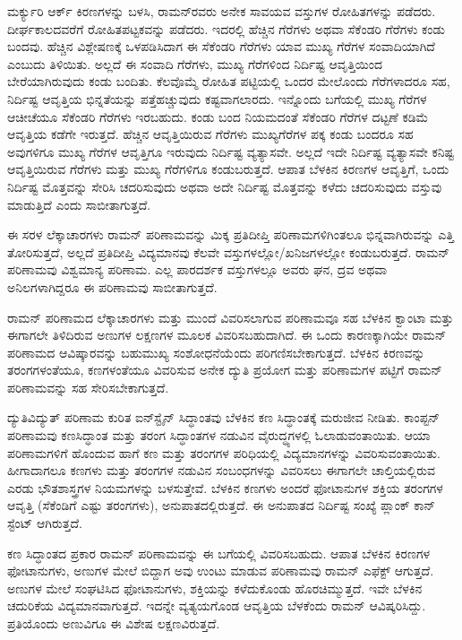 ಮರ್ಕ್ಯುರಿ ಆರ್ಕ್ ಕಿರಣಗಳನ್ನು ಬಳಸಿ, ರಾಮನ್‍ರವರು ಅನೇಕ ಸಾವಯವ ವಸ್ತುಗಳ ರೋಹಿತಗಳನ್ನು ಪಡೆದರು. ದೀರ್ಘಕಾಲದವರೆಗೆ ರೋಹಿತಪಟ್ಟಕವನ್ನು ಪಡೆದರು. ಇದರಲ್ಲಿ ಹೆಚ್ಚಿನ ಗೆರೆಗಳು ಅಥವಾ ಸೆಕೆಂಡರಿ ಗೆರೆಗಳು ಕಂಡು ಬಂದವು. ಹೆಚ್ಚಿನ ವಿಶ್ಲೇಷಣಕ್ಕೆ ಒಳಪಡಿಸಿದಾಗ ಈ ಸೆಕೆಂಡರಿ ಗೆರೆಗಳು ಯಾವ ಮುಖ್ಯ ಗೆರೆಗಳ ಸಂವಾದಿಯಾಗಿದೆ ಎಂಬುದು ತಿಳಿಯಿತು. ಅಲ್ಲದೆ ಈ ಸಂವಾದಿ ಗೆರೆಗಳು, ಮುಖ್ಯ ಗೆರೆಗಳಿಂದ ನಿರ್ದಿಷ್ಟ ಆವೃತ್ತಿಯಿಂದ ಬೇರೆಯಾಗಿರುವುದು ಕಂಡು ಬಂದಿತು. ಕೆಲವೊಮ್ಮೆ ರೋಹಿತ ಪಟ್ಟಿಯಲ್ಲಿ ಒಂದರ ಮೇಲೊಂದು ಗೆರೆಗಳಾದರೂ ಸಹ, ನಿರ್ದಿಷ್ಟ ಆವೃತ್ತಿಯ ಭಿನ್ನತೆಯನ್ನು ಪತ್ತೆಹಚ್ಚುವುದು ಕಷ್ಟವಾಗಲಾರದು. ಇನ್ನೊಂದು ಬಗೆಯಲ್ಲಿ ಮುಖ್ಯ ಗೆರೆಗಳ ಆಚೀಚೆಯೂ ಸೆಕೆಂಡರಿ ಗೆರೆಗಳು ಇರಬಹುದು. ಕಂಡು ಬಂದ ನಿಯಮದಂತೆ ಸೆಕೆಂಡರಿ ಗೆರೆಗಳ ದಟ್ಟಣೆ ಕಡಿಮೆ ಆವೃತ್ತಿಯ ಕಡೆಗೇ ಇರುತ್ತದೆ. ಹೆಚ್ಚಿನ ಆವೃತ್ತಿಯಿರುವ ಗೆರೆಗಳು ಮುಖ್ಯಗೆರೆಗಳ ಪಕ್ಕ ಕಂಡು ಬಂದರೂ ಸಹ ಅವುಗಳಿಗೂ ಮುಖ್ಯ ಗೆರೆಗಳ ಆವೃತ್ತಿಗೂ ಇರುವುದು ನಿರ್ದಿಷ್ಟ ವ್ಯತ್ಯಾಸವೇ. ಅಲ್ಲದೆ ಇದೇ ನಿರ್ದಿಷ್ಟ ವ್ಯತ್ಯಾಸವೇ ಕನಿಷ್ಟ ಆವೃತ್ತಿಯಿರುವ ಗೆರೆಗಳು ಮತ್ತು ಮುಖ್ಯ ಗೆರೆಗಳಿಗೂ ಕಂಡುಬರುತ್ತದೆ. ಆಪಾತ ಬೆಳಕಿನ ಕಿರಣಗಳ ಆವೃತ್ತಿಗೆ, ಒಂದು ನಿರ್ದಿಷ್ಟ ಮೊತ್ತವನ್ನು ಸೇರಿಸಿ ಚದರಿಸುವುದು ಅಥವಾ ಅದೇ ನಿರ್ದಿಷ್ಟ ಮೊತ್ತವನ್ನು ಕಳೆದು ಚದರಿಸುವುದು ವಸ್ತುವು ಮಾಡುತ್ತಿದೆ ಎಂದು ಸಾಬೀತಾಗುತ್ತದೆ.

ಈ ಸರಳ ಲೆಕ್ಕಾಚಾರಗಳು ರಾಮನ್ ಪರಿಣಾಮವನ್ನು ಮಿಕ್ಕ ಪ್ರತಿದೀಪ್ತಿ ಪರಿಣಾಮಗಳಿಗಿಂತಲೂ ಭಿನ್ನವಾಗಿರುವನ್ನು ಎತ್ತಿ ತೋರಿಸುತ್ತದೆ, ಅಲ್ಲದೆ ಪ್ರತಿದೀಪ್ತಿ ವಿದ್ಯಮಾನವು ಕೆಲವೇ ವಸ್ತುಗಳಲ್ಲೋ/\break ಖನಿಜಗಳಲ್ಲೋ ಕಂಡುಬರುತ್ತದೆ. ರಾಮನ್ ಪರಿಣಾಮವು ವಿಶ್ವಮಾನ್ಯ ಪರಿಣಾಮ. ಎಲ್ಲ ಪಾರದರ್ಶಕ ವಸ್ತುಗಳಲ್ಲೂ ಅವರು ಘನ, ದ್ರವ ಅಥವಾ ಅನಿಲಗಳಾಗಿದ್ದರೂ ಈ ಪರಿಣಾಮವು ಸಾಬೀತಾಗುತ್ತದೆ.

ರಾಮನ್ ಪರಿಣಾಮದ ಲೆಕ್ಕಾಚಾರಗಳು ಮತ್ತು ಮುಂದೆ ವಿವರಿಸಲಾಗುವ ಪರಿಣಾಮವೂ ಸಹ ಬೆಳಕಿನ ಕ್ವಾಂಟಾ ಮತ್ತು ಈಗಾಗಲೇ ತಿಳಿದಿರುವ ಅಣುಗಳ ಲಕ್ಷಣಗಳ ಮೂಲಕ ವಿವರಿಸಬಹುದಾಗಿದೆ. ಈ ಒಂದು ಕಾರಣಕ್ಕಾಗಿಯೇ ರಾಮನ್ ಪರಿಣಾಮದ ಆವಿಷ್ಕಾರವನ್ನು ಬಹುಮುಖ್ಯ ಸಂಶೋಧನೆ\-ಯೆಂದು ಪರಿಗಣಿಸಬೇಕಾಗುತ್ತದೆ. ಬೆಳಕಿನ ಕಿರಣವನ್ನು ತರಂಗಗಳಂತೆಯೂ, ಕಣಗಳಂತೆಯೂ ವಿವರಿಸುವ ಅನೇಕ ದ್ಯುತಿ ಪ್ರಯೋಗ ಮತ್ತು ಪರಿಣಾಮಗಳ ಪಟ್ಟಿಗೆ ರಾಮನ್ ಪರಿಣಾಮವನ್ನು ಸಹ ಸೇರಿಸಬೇಕಾಗುತ್ತದೆ.

ದ್ಯುತಿವಿದ್ಯುತ್ ಪರಿಣಾಮ ಕುರಿತ ಐನ್‍ಸ್ಟೈನ್ ಸಿದ್ಧಾಂತವು ಬೆಳಕಿನ ಕಣ ಸಿದ್ಧಾಂತಕ್ಕೆ ಮರುಜೀವ ನೀಡಿತು.  ಕಾಂಪ್ಟನ್ ಪರಿಣಾಮವು ಕಣಸಿದ್ಧಾಂತ ಮತ್ತು ತರಂಗ ಸಿದ್ಧಾಂತಗಳ ನಡುವಿನ ವೈರುದ್ಧ್ಯಗಳಲ್ಲಿ ಓಲಾಡುವಂತಾಯಿತು. ಆಯಾ ಪರಿಣಾಮಗಳಿಗೆ ಹೊಂದುವ ಹಾಗೆ ಕಣ ಮತ್ತು ತರಂಗಗಳ ಪರಿಧಿಯಲ್ಲಿ ವಿದ್ಯಮಾನಗಳನ್ನು ವಿವರಿಸುವಂತಾಯಿತು. ಹೀಗಾದಾಗಲೂ ಕಣಗಳು ಮತ್ತು ತರಂಗಗಳ ನಡುವಿನ ಸಂಬಂಧಗಳನ್ನು ವಿವರಿಸಲು ಈಗಾಗಲೇ ಚಾಲ್ತಿಯಲ್ಲಿರುವ ಎರಡು ಭೌತಶಾಸ್ತ್ರಗಳ ನಿಯಮಗಳನ್ನು ಬಳಸುತ್ತೇವೆ. ಬೆಳಕಿನ ಕಣಗಳು ಅಂದರೆ ಫೋಟಾನುಗಳ ಶಕ್ತಿಯ ತರಂಗಗಳ ಆವೃತ್ತಿ (ಸೆಕೆಂಡಿಗೆ ಎಷ್ಟು ತರಂಗಗಳು), ಅನುಪಾತದಲ್ಲಿರುತ್ತದೆ. ಈ ಅನುಪಾತದ ನಿರ್ದಿಷ್ಟ ಸಂಖ್ಯೆ ಪ್ಲಾಂಕ್ ಕಾನ್ ಸ್ಟೆಂಟ್  ಆಗಿರುತ್ತದೆ.

ಕಣ ಸಿದ್ಧಾಂತದ ಪ್ರಕಾರ ರಾಮನ್ ಪರಿಣಾಮವನ್ನು ಈ ಬಗೆಯಲ್ಲಿ ವಿವರಿಸಬಹುದು. ಆಪಾತ ಬೆಳಕಿನ ಕಿರಣಗಳ ಫೋಟಾನುಗಳು, ಅಣುಗಳ ಮೇಲೆ ಬಿದ್ದಾಗ ಅವು ಉಂಟು ಮಾಡುವ ಪರಿ\-ಣಾಮವು ರಾಮನ್ ಎಫೆಕ್ಟ್ ಆಗುತ್ತದೆ. ಅಣುಗಳ ಮೇಲೆ ಸಂಘಟಿಸಿದ ಫೋಟಾನುಗಳು, ಶಕ್ತಿಯನ್ನು ಕಳೆದುಕೊಂಡು ಹೊರಚಿಮ್ಮುತ್ತದೆ. ಇವೇ ಬೆಳಕಿನ ಚದುರಿಕೆಯ ವಿದ್ಯಮಾನವಾಗುತ್ತದೆ. ಇದನ್ನೇ ವ್ಯತ್ಯಯಗೊಂಡ ಆವೃತ್ತಿಯ ಬೆಳಕೆಂದು ರಾಮನ್ ಆವಿಷ್ಕರಿಸಿದ್ದು. ಪ್ರತಿಯೊಂದು ಅಣುವಿಗೂ ಈ ವಿಶೇಷ ಲಕ್ಷಣವಿರುತ್ತದೆ.

